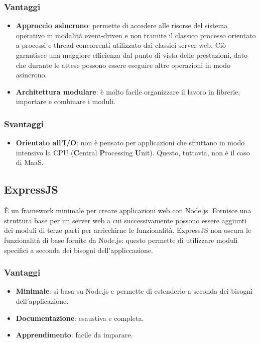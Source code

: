 \subsubsection{Vantaggi}
\begin{itemize}
\item \textbf{Approccio asincrono}: permette di accedere alle risorse del sistema operativo in modalit\`a event-driven e non tramite il classico processo orientato a processi e thread concorrenti utilizzato dai classici server web. Ci\`o garantisce una maggiore efficienza dal punto di vista delle prestazioni, dato che durante le attese possono essere eseguire altre operazioni in modo asincrono.
\item \textbf{Architettura modulare}: \`e molto facile organizzare il lavoro in librerie, importare e combinare i moduli.
\end{itemize}
\subsubsection{Svantaggi}
\begin{itemize}
\item \textbf{Orientato all'I/O}: non \`e pensato per applicazioni che sfruttano in modo intensivo la CPU (\textbf{C}entral \textbf{P}rocessing \textbf{U}nit). Questo, tuttavia, non \`e il caso di MaaS.
\end{itemize}

\subsection{ExpressJS}
È un framework minimale per creare applicazioni web con Node.js. Fornisce una struttura base per un server web a cui successivamente possono essere aggiunti dei moduli di terze parti per arricchirne le funzionalità. ExpressJS non oscura le funzionalità di base fornite da Node.js: questo permette di utilizzare moduli specifici a seconda dei bisogni dell'appliccazione.
\subsubsection{Vantaggi}
\begin{itemize}
\item \textbf{Minimale}: si basa su Node.js e permette di estenderlo a seconda dei bisogni dell'applicazione.
\item \textbf{Documentazione}: esaustiva e completa.
\item \textbf{Apprendimento}: facile da imparare.
\end{itemize}
